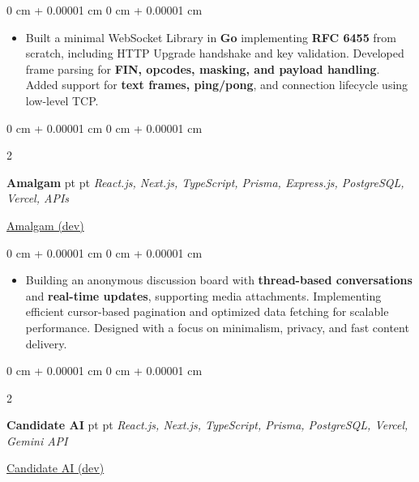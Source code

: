 \documentclass[10pt, letterpaper]{article}
\newenvironment{highlights}{
    \begin{itemize}[
        topsep=0.10 cm,
        parsep=0.10 cm,
        partopsep=0pt,
        itemsep=0pt,
        leftmargin=0 cm + 10pt
    ]
}{
    \end{itemize}
}
\newenvironment{onecolentry}{
    \begin{adjustwidth}{
        0 cm + 0.00001 cm
    }{
        0 cm + 0.00001 cm
    }
}{
    \end{adjustwidth}
}
\newenvironment{twocolentry}[2][]{
    \onecolentry
    \def\secondColumn{#2}
    \setcolumnwidth{\fill, 4.5 cm}
    \begin{paracol}{2}
}{
    \switchcolumn \raggedleft \secondColumn
    \end{paracol}
    \endonecolentry
}
\let\hrefWithoutArrow\href
\begin{document}
        \vspace{0.15 cm}
        \begin{onecolentry}
            \begin{highlights}
                 \item Built a minimal WebSocket Library in \textbf{Go} implementing \textbf{RFC 6455} from scratch, including HTTP Upgrade handshake and key validation. Developed frame parsing for \textbf{FIN, opcodes, masking, and payload handling}. Added support for \textbf{text frames, ping/pong}, and connection lifecycle using low-level TCP.
            \end{highlights}
        \end{onecolentry}

        \vspace{0.20 cm}

        \begin{twocolentry}{
            {\hrefWithoutArrow{https://github.com/udaycmd/amalgam}{\faIcon{github}\;Amalgam (dev)}}
        }
            \textbf{Amalgam}
             pt
            \AND
             pt
            \textit{React.js, Next.js, TypeScript, Prisma, Express.js, PostgreSQL, Vercel, APIs}
            \end{twocolentry}

        \vspace{0.15 cm}
        \begin{onecolentry}
            \begin{highlights}
                \item Building an anonymous discussion board with \textbf{thread-based conversations} and \textbf{real-time updates}, supporting media attachments. Implementing efficient cursor-based pagination and optimized data fetching for scalable performance. Designed with a focus on minimalism, privacy, and fast content delivery. 
            \end{highlights}
        \end{onecolentry}

        \vspace{0.20cm}

        \begin{twocolentry}{
            {\hrefWithoutArrow{https://github.com/udaycmd/candidateai}{\faIcon{github}\;Candidate AI (dev)}}
        }
            \textbf{Candidate AI}
             pt
            \AND
             pt
            \textit{React.js, Next.js, TypeScript, Prisma, PostgreSQL, Vercel, Gemini API}
            \end{twocolentry}
\end{document}
